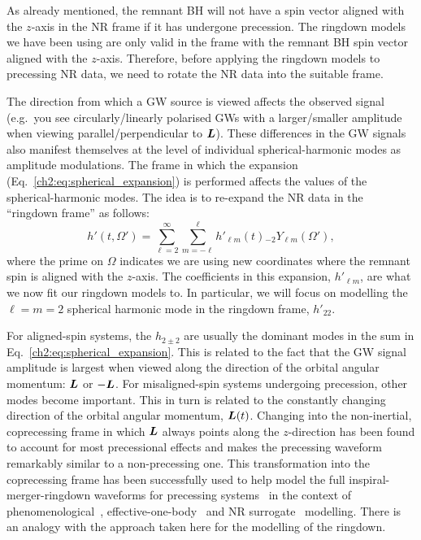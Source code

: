 As already mentioned, the remnant BH will not have a spin vector aligned with the $z$-axis in the NR frame if it has undergone precession. 
The ringdown models we have been using are only valid in the frame with the remnant BH spin vector aligned with the $z$-axis.
Therefore, before applying the ringdown models to precessing NR data, we need to rotate the NR data into the suitable frame. 

The direction from which a GW source is viewed affects the observed signal 
(e.g.\ you see circularly/linearly polarised GWs with a larger/smaller amplitude when viewing parallel/perpendicular to $\vb*{L}$).
These differences in the GW signals also manifest themselves at the level of individual spherical-harmonic modes as amplitude modulations. 
The frame in which the expansion (Eq.~\ref{ch2:eq:spherical_expansion}) is performed affects the values of the spherical-harmonic modes. 
The idea is to re-expand the NR data in the ``ringdown frame'' as follows:
\begin{equation}\label{hprimedecomp}
    h'(t,\Omega') = \sum_{\ell = 2}^\infty \sum_{m = -\ell}^\ell h'_{\ell m}(t) {}_{-2}Y_{\ell m}(\Omega'),
\end{equation}
where the prime on $\Omega$ indicates we are using new coordinates where the remnant spin is aligned with the $z$-axis.
The coefficients in this expansion, $h'_{\ell m}$, are what we now fit our ringdown models to. 
In particular, we will focus on modelling the $\ell = m = 2$ spherical harmonic mode in the ringdown frame, $h'_{22}$.

For aligned-spin systems, the $h_{2\pm2}$ are usually the dominant modes in the sum in Eq.~\ref{ch2:eq:spherical_expansion}. This is related to the fact that the GW signal amplitude is largest when viewed along the direction of the orbital angular momentum: $\vb*{L}$ or $-\vb*{L}$. For misaligned-spin systems undergoing precession, other modes become important. This in turn is related to the constantly changing direction of the orbital angular momentum, $\vb*{L}(t)$.
Changing into the non-inertial, coprecessing frame in which $\vb*{L}$ always points along the $z$-direction has been found to account for most precessional effects and makes the precessing waveform remarkably similar to a non-precessing one.
This transformation into the coprecessing frame has been successfully used to help model the full inspiral-merger-ringdown waveforms for precessing systems~\cite{Schmidt:2010it, Schmidt:2012rh} in the context of phenomenological~\cite{Hannam:2013oca, Khan:2018fmp, Pratten:2020ceb}, effective-one-body~\cite{Pan:2013rra, Ossokine:2020kjp} and NR surrogate~\cite{Blackman:2017dfb, Blackman:2017pcm, Varma:2019csw} modelling.
There is an analogy with the approach taken here for the modelling of the ringdown. 

